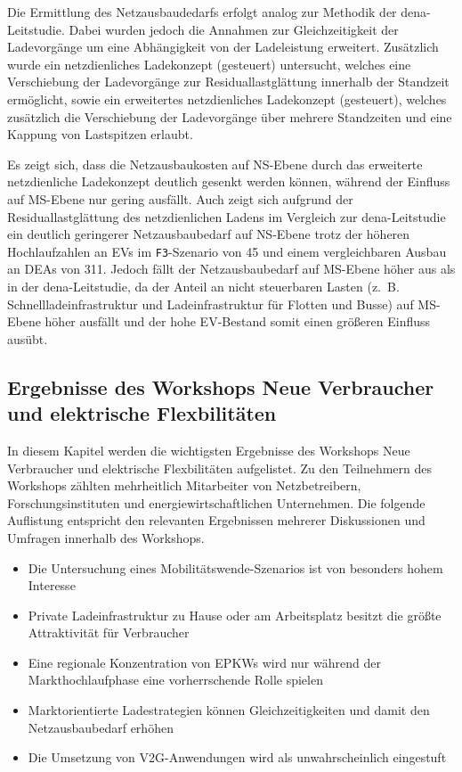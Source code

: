 Die Ermittlung des Netzausbaudedarfs erfolgt analog zur Methodik der dena-Leitstudie.
Dabei wurden jedoch die Annahmen zur Gleichzeitigkeit der Ladevorgänge um eine Abhängigkeit von der Ladeleistung erweitert.
Zusätzlich wurde ein netzdienliches Ladekonzept (gesteuert) untersucht, welches eine Verschiebung der Ladevorgänge zur Residuallastglättung innerhalb der Standzeit ermöglicht, sowie ein erweitertes netzdienliches Ladekonzept (gesteuert\Plus), welches zusätzlich die Verschiebung der Ladevorgänge über mehrere Standzeiten und eine Kappung von Lastspitzen erlaubt.\medskip

Es zeigt sich, dass die Netzausbaukosten auf \gls{NS}-Ebene durch das erweiterte netzdienliche Ladekonzept deutlich gesenkt werden können, während der Einfluss auf \gls{MS}-Ebene nur gering ausfällt.
Auch zeigt sich aufgrund der Residuallastglättung des netzdienlichen Ladens im Vergleich zur dena-Leitstudie ein deutlich geringerer Netzausbaubedarf auf \gls{NS}-Ebene trotz der höheren Hochlaufzahlen an \glspl{EV} im \texttt{F3}-Szenario von \SI{45}{\MioStk} und einem vergleichbaren Ausbau an \glspl{DEA} von \SI{311}{\gw}.
Jedoch fällt der Netzausbaubedarf auf \gls{MS}-Ebene höher aus als in der dena-Leitstudie, da der Anteil an nicht steuerbaren Lasten (z.~B. Schnellladeinfrastruktur und Ladeinfrastruktur für Flotten und Busse) auf \gls{MS}-Ebene höher ausfällt und der hohe \gls{EV}-Bestand somit einen größeren Einfluss ausübt.

\subsection{Ergebnisse des Workshops \glqq Neue Verbraucher und elektrische Flexbilitäten\grqq{}}

In diesem Kapitel werden die wichtigsten Ergebnisse des Workshops \glqq Neue Verbraucher und elektrische Flexbilitäten\grqq{} aufgelistet.
Zu den Teilnehmern des Workshops zählten mehrheitlich Mitarbeiter von Netzbetreibern, Forschungsinstituten und energiewirtschaftlichen Unternehmen.
Die folgende Auflistung entspricht den relevanten Ergebnissen mehrerer Diskussionen und Umfragen innerhalb des Workshops.

\begin{itemize}
	\item Die Untersuchung eines Mobilitätswende-Szenarios ist von besonders hohem Interesse
	\item Private Ladeinfrastruktur zu Hause oder am Arbeitsplatz besitzt die größte Attraktivität für Verbraucher
	\item Eine regionale Konzentration von \glspl{EPKW} wird nur während der Markthochlaufphase eine vorherrschende Rolle spielen
	\item Marktorientierte Ladestrategien können Gleichzeitigkeiten und damit den Netzausbaubedarf erhöhen
	\item Die Umsetzung von \gls{V2G}-Anwendungen wird als unwahrscheinlich eingestuft
	
\end{itemize}

